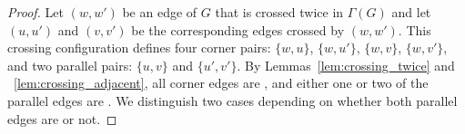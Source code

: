 \begin{proof}
Let $(w,w')$ be an edge of $G$ that is crossed twice in $\Gamma(G)$ and let $(u,u')$ and $(v,v')$ be the corresponding edges crossed by $(w,w')$. This crossing configuration defines four corner pairs: $\{w,u\}$, $\{w,u'\}$, $\{w,v\}$, $\{w,v'\}$, and two parallel pairs: $\{u,v\}$ and $\{u',v'\}$. By Lemmas~\ref{lem:crossing_twice} and ~\ref{lem:crossing_adjacent}, all corner edges are \pes, and either one or two of the parallel edges are \pes. We distinguish two cases depending on whether both parallel edges are \pes or not.



\end{proof}
